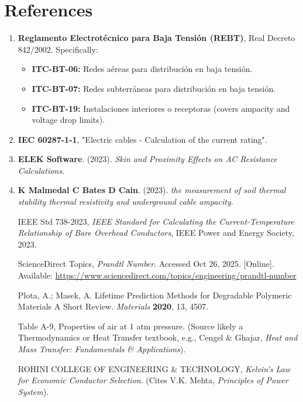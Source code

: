 \documentclass[12pt, a4paper]{article}
\begin{document}
\section{References}
\begin{enumerate}
    \item \textbf{Reglamento Electrotécnico para Baja Tensión (REBT)}, Real Decreto 842/2002. Specifically:
    \begin{itemize}
        \item \textbf{ITC-BT-06:} Redes aéreas para distribución en baja tensión.
        \item \textbf{ITC-BT-07:} Redes subterráneas para distribución en baja tensión.
        \item \textbf{ITC-BT-19:} Instalaciones interiores o receptoras (covers ampacity and voltage drop limits).
    \end{itemize}
    \item \textbf{IEC 60287-1-1}, "Electric cables - Calculation of the current rating".
    
    \item \textbf{ELEK Software}. (2023). \textit{Skin and Proximity Effects on AC Resistance Calculations}.
    
    \item \textbf{K Malmedal C Bates D Cain}. (2023). \textit{the measurement of soil thermal stability thermal resistivity and underground cable ampacity}.
    
IEEE Std 738-2023, \textit{IEEE Standard for Calculating the Current-Temperature Relationship of Bare Overhead Conductors}, IEEE Power and Energy Society, 2023.

ScienceDirect Topics, \textit{Prandtl Number}. Accessed Oct 26, 2025. [Online]. Available: \url{https://www.sciencedirect.com/topics/engineering/prandtl-number}

Plota, A.; Masek, A. Lifetime Prediction Methods for Degradable Polymeric Materials A Short Review. \textit{Materials} \textbf{2020}, 13, 4507.

Table A-9, Properties of air at 1 atm pressure. (Source likely a Thermodynamics or Heat Transfer textbook, e.g., Cengel \& Ghajar, \textit{Heat and Mass Transfer: Fundamentals \& Applications}).

ROHINI COLLEGE OF ENGINEERING \& TECHNOLOGY, \textit{Kelvin's Law for Economic Conductor Selection}. (Cites V.K. Mehta, \textit{Principles of Power System}).


\end{enumerate}
\end{document}
